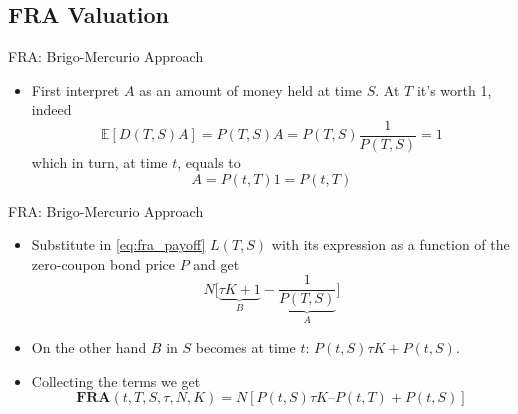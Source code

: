\documentclass{beamer}
\begin{document}
%	
%	

\subsection{FRA Valuation}
\begin{frame}{FRA: Brigo-Mercurio Approach}
	\begin{itemize}
		\item<2-> First interpret $A$ as an amount of money held at time $S$. At $T$ it's worth 1, indeed 
		\begin{equation*}
			\mathbb{E}[D(T,S)A] = P(T,S)A = P(T,S)\frac{1}{P(T,S)}=1
		\end{equation*}
		which in turn, at time $t$, equals to
		\begin{equation*}
			A = P(t,T) 1 = P(t,T)
		\end{equation*}
	\end{itemize}
\end{frame}

\begin{frame}{FRA: Brigo-Mercurio Approach}
	\begin{itemize}
		\item Substitute in \cref{eq:fra_payoff} $L(T,S)$ with its expression as a function of the zero-coupon bond price $P$ and get
		\begin{equation*}
			N\bigg[\underbrace{\tau K + 1}_{B} - \underbrace{\frac{1}{P(T, S)}}_{A}\bigg]
		\end{equation*}
		\item<1-> On the other hand $B$ in $S$ becomes at time $t$:
		$P(t,S)\tau K + P(t, S)$.
		\item<2-> Collecting the terms we get
		\begin{equation}
			\boxed{\textbf{FRA}(t,T,S,\tau,N,K)=N[P(t,S)\tau K–P(t,T)+P(t,S)]}
		\end{equation}
	\end{itemize}
	\myendproof
\end{frame}
\end{document}
